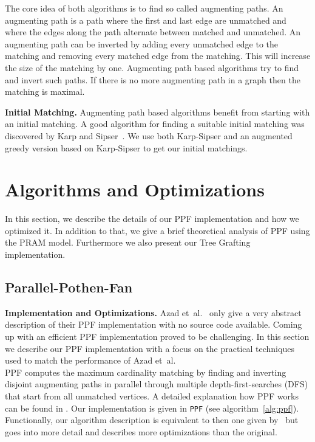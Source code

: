 \documentclass[letterpaper]{article}
\newcommand{\mypar}[1]{{\bf #1.}}
\begin{document}
The core idea of both algorithms is to find so called augmenting paths. An augmenting path is a path where the first 
and last edge are unmatched and where the edges along the path alternate between matched and unmatched. 
An augmenting path can be inverted by adding every unmatched edge to the matching and removing every matched edge from the matching. 
This will increase the size of the matching by one. 
Augmenting path based algorithms try to find and invert such paths. If there is no more augmenting path in a graph then the matching is maximal.

\mypar{Initial Matching}
Augmenting path based algorithms benefit from starting with an initial matching. 
A good algorithm for finding a suitable initial matching was discovered by Karp and Sipser~\cite{KarpS81}.
We use both Karp-Sipser and an augmented greedy version based on Karp-Sipser to get our initial matchings. 

\section{Algorithms and Optimizations}\label{sec:pfopt}

In this section, we describe the details of our PPF implementation and how we optimized it. In addition to that, we 
give a brief theoretical analysis of PPF using the PRAM model. Furthermore we also present our Tree Grafting implementation.

\subsection{Parallel-Pothen-Fan}\label{sec:pf}

\mypar{Implementation and Optimizations} Azad et\ al.~\cite{Azad:2012} only give a very abstract description of their PPF implementation with no source code available. 
Coming up with an efficient PPF implementation proved to be challenging. 
In this section we describe our PPF implementation with a focus on the practical techniques used to match the performance of Azad et\ al.\\

PPF computes the maximum cardinality matching by finding and inverting disjoint augmenting paths in parallel through multiple depth-first-searches (DFS)
that start from all unmatched vertices. A detailed explanation how PPF works can be found in \cite{Azad:2012}. 
Our implementation is given in \texttt{PPF} (see algorithm~\ref{alg:ppf}). 
Functionally, our algorithm description is equivalent to then one given by~\cite{Azad:2012} 
but goes into more detail and describes more optimizations than the original.\\
\end{document}
